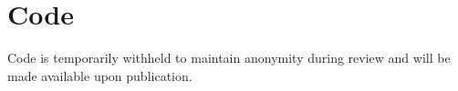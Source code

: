 \section*{Code}
\label{sec:code}

Code is temporarily withheld to maintain anonymity during review and will be made available upon publication.

